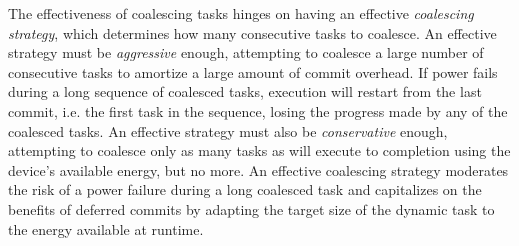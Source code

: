 The effectiveness of coalescing tasks hinges on having an effective {\em
coalescing strategy}, which determines how many consecutive tasks to coalesce.
An effective strategy must be {\em aggressive} enough, attempting to coalesce a
large number of consecutive tasks to amortize a large amount of commit overhead.   
%
If power fails during a long sequence of coalesced tasks, execution will
restart from the last commit, i.e. the first task in the sequence, losing the
progress made by any of the coalesced tasks.
%
An effective strategy must also be {\em
conservative} enough, attempting to coalesce only as many tasks as will execute
to completion using the device's available energy, but no more.
%
An effective coalescing strategy moderates the risk of a power failure during a
long coalesced task and capitalizes on the benefits of deferred commits by
adapting the target size of the dynamic task to the energy available at
runtime. 


%


